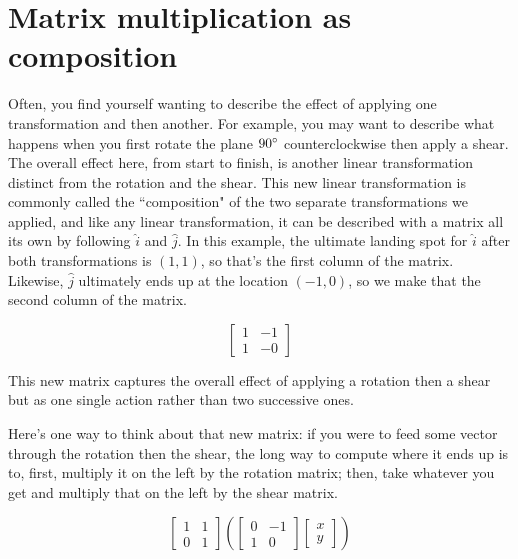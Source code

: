 \section{Matrix multiplication as composition}

Often, you find yourself wanting to describe the effect of applying one
transformation and then another. For example, you may want to describe what
happens when you first rotate the plane $90\degree$ counterclockwise then apply
a shear. The overall effect here, from start to finish, is another linear
transformation distinct from the rotation and the shear. This new linear
transformation is commonly called the ``composition" of the two separate
transformations we applied, and like any linear transformation, it can be
described with a matrix all its own by following $\hat{i}$ and $\hat{j}$. In
this example, the ultimate landing spot for $\hat{i}$ after both transformations
is $(1, 1)$, so that's the first column of the matrix. Likewise, $\hat{j}$
ultimately ends up at the location $(-1, 0)$, so we make that the second column
of the matrix.

\begin{equation*}
  \begin{bmatrix}
    1 & -1 \\
    1 & -0
  \end{bmatrix}
\end{equation*}

This new matrix captures the overall effect of applying a rotation then a shear
but as one single action rather than two successive ones.

Here's one way to think about that new matrix: if you were to feed some vector
through the rotation then the shear, the long way to compute where it ends up is
to, first, multiply it on the left by the rotation matrix; then, take whatever
you get and multiply that on the left by the shear matrix.

\begin{equation*}
  \begin{bmatrix}
    1 & 1 \\
    0 & 1
  \end{bmatrix}\left(
  \begin{bmatrix}
    0 & -1 \\
    1 & 0
  \end{bmatrix}
  \begin{bmatrix}
    x \\
    y
  \end{bmatrix}\right)
\end{equation*}

